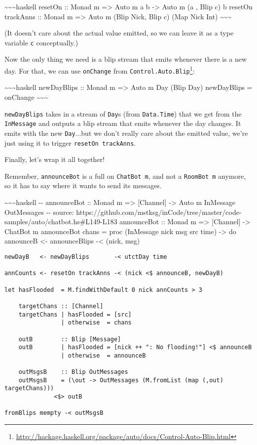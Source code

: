 \documentclass[]{article}
\renewcommand{\href}[2]{#2\footnote{\url{#1}}}
\begin{document}
\textasciitilde{}\textasciitilde{}\textasciitilde{}haskell resetOn :: Monad m
=\textgreater{} Auto m a b -\textgreater{} Auto m (a , Blip c) b resetOn
trackAnns :: Monad m =\textgreater{} Auto m (Blip Nick, Blip c) (Map Nick Int)
\textasciitilde{}\textasciitilde{}\textasciitilde{}

(It doesn't care about the actual value emitted, so we can leave it as a type
variable \texttt{c} conceptually.)

Now the only thing we need is a blip stream that emits whenever there is a new
day. For that, we can use \texttt{onChange} from
\href{http://hackage.haskell.org/package/auto/docs/Control-Auto-Blip.html}{\texttt{Control.Auto.Blip}}:

\textasciitilde{}\textasciitilde{}\textasciitilde{}haskell newDayBlips :: Monad
m =\textgreater{} Auto m Day (Blip Day) newDayBlips = onChange
\textasciitilde{}\textasciitilde{}\textasciitilde{}

\texttt{newDayBlips} takes in a stream of \texttt{Day}s (from
\texttt{Data.Time}) that we get from the \texttt{InMessage} and outputs a blip
stream that emits whenever the day changes. It emits with the new
\texttt{Day}...but we don't really care about the emitted value, we're just
using it to trigger \texttt{resetOn\ trackAnns}.

Finally, let's wrap it all together!

Remember, \texttt{announceBot} is a full on \texttt{ChatBot\ m}, and not a
\texttt{RoomBot\ m} anymore, so it has to say where it wants to send its
messages.

\textasciitilde{}\textasciitilde{}\textasciitilde{}haskell -\/- announceBot ::
Monad m =\textgreater{} {[}Channel{]} -\textgreater{} Auto m InMessage
OutMessages -\/- source:
https://github.com/mstksg/inCode/tree/master/code-samples/auto/chatbot.hs\#L149-L183
announceBot :: Monad m =\textgreater{} {[}Channel{]} -\textgreater{} ChatBot m
announceBot chans = proc (InMessage nick msg src time) -\textgreater{} do
announceB \textless{}- announceBlips -\textless{} (nick, msg)

\begin{verbatim}
newDayB   <- newDayBlips       -< utctDay time

annCounts <- resetOn trackAnns -< (nick <$ announceB, newDayB)

let hasFlooded  = M.findWithDefault 0 nick annCounts > 3

    targetChans :: [Channel]
    targetChans | hasFlooded = [src]
                | otherwise  = chans

    outB        :: Blip [Message]
    outB        | hasFlooded = [nick ++ ": No flooding!"] <$ announceB
                | otherwise  = announceB

    outMsgsB    :: Blip OutMessages
    outMsgsB    = (\out -> OutMessages (M.fromList (map (,out) targetChans)))
              <$> outB

fromBlips mempty -< outMsgsB
\end{verbatim}
\end{document}
